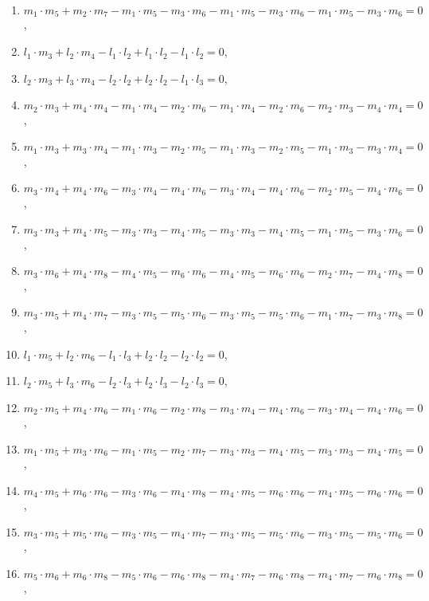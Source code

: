 \begin{enumerate}
    \item $m_1 \cdot m_5 + m_2 \cdot m_7 - m_1 \cdot m_5 - m_3 \cdot m_6 - m_1 \cdot m_5 - m_3 \cdot m_6 - m_1 \cdot m_5 - m_3 \cdot m_6 = 0$,
    \item $l_1 \cdot m_3 + l_2 \cdot m_4 - l_1 \cdot l_2 + l_1 \cdot l_2 - l_1 \cdot l_2 = 0$,
    \item $l_2 \cdot m_3 + l_3 \cdot m_4 - l_2 \cdot l_2 + l_2 \cdot l_2 - l_1 \cdot l_3 = 0$,
    \item $m_2 \cdot m_3 + m_4 \cdot m_4 - m_1 \cdot m_4 - m_2 \cdot m_6 - m_1 \cdot m_4 - m_2 \cdot m_6 - m_2 \cdot m_3 - m_4 \cdot m_4 = 0$,
    \item $m_1 \cdot m_3 + m_3 \cdot m_4 - m_1 \cdot m_3 - m_2 \cdot m_5 - m_1 \cdot m_3 - m_2 \cdot m_5 - m_1 \cdot m_3 - m_3 \cdot m_4 = 0$,
    \item $m_3 \cdot m_4 + m_4 \cdot m_6 - m_3 \cdot m_4 - m_4 \cdot m_6 - m_3 \cdot m_4 - m_4 \cdot m_6 - m_2 \cdot m_5 - m_4 \cdot m_6 = 0$,
    \item $m_3 \cdot m_3 + m_4 \cdot m_5 - m_3 \cdot m_3 - m_4 \cdot m_5 - m_3 \cdot m_3 - m_4 \cdot m_5 - m_1 \cdot m_5 - m_3 \cdot m_6 = 0$,
    \item $m_3 \cdot m_6 + m_4 \cdot m_8 - m_4 \cdot m_5 - m_6 \cdot m_6 - m_4 \cdot m_5 - m_6 \cdot m_6 - m_2 \cdot m_7 - m_4 \cdot m_8 = 0$,
    \item $m_3 \cdot m_5 + m_4 \cdot m_7 - m_3 \cdot m_5 - m_5 \cdot m_6 - m_3 \cdot m_5 - m_5 \cdot m_6 - m_1 \cdot m_7 - m_3 \cdot m_8 = 0$,
    \item $l_1 \cdot m_5 + l_2 \cdot m_6 - l_1 \cdot l_3 + l_2 \cdot l_2 - l_2 \cdot l_2 = 0$,
    \item $l_2 \cdot m_5 + l_3 \cdot m_6 - l_2 \cdot l_3 + l_2 \cdot l_3 - l_2 \cdot l_3 = 0$,
    \item $m_2 \cdot m_5 + m_4 \cdot m_6 - m_1 \cdot m_6 - m_2 \cdot m_8 - m_3 \cdot m_4 - m_4 \cdot m_6 - m_3 \cdot m_4 - m_4 \cdot m_6 = 0$,
    \item $m_1 \cdot m_5 + m_3 \cdot m_6 - m_1 \cdot m_5 - m_2 \cdot m_7 - m_3 \cdot m_3 - m_4 \cdot m_5 - m_3 \cdot m_3 - m_4 \cdot m_5 = 0$,
    \item $m_4 \cdot m_5 + m_6 \cdot m_6 - m_3 \cdot m_6 - m_4 \cdot m_8 - m_4 \cdot m_5 - m_6 \cdot m_6 - m_4 \cdot m_5 - m_6 \cdot m_6 = 0$,
    \item $m_3 \cdot m_5 + m_5 \cdot m_6 - m_3 \cdot m_5 - m_4 \cdot m_7 - m_3 \cdot m_5 - m_5 \cdot m_6 - m_3 \cdot m_5 - m_5 \cdot m_6 = 0$,
    \item $m_5 \cdot m_6 + m_6 \cdot m_8 - m_5 \cdot m_6 - m_6 \cdot m_8 - m_4 \cdot m_7 - m_6 \cdot m_8 - m_4 \cdot m_7 - m_6 \cdot m_8 = 0$,

\end{enumerate}
